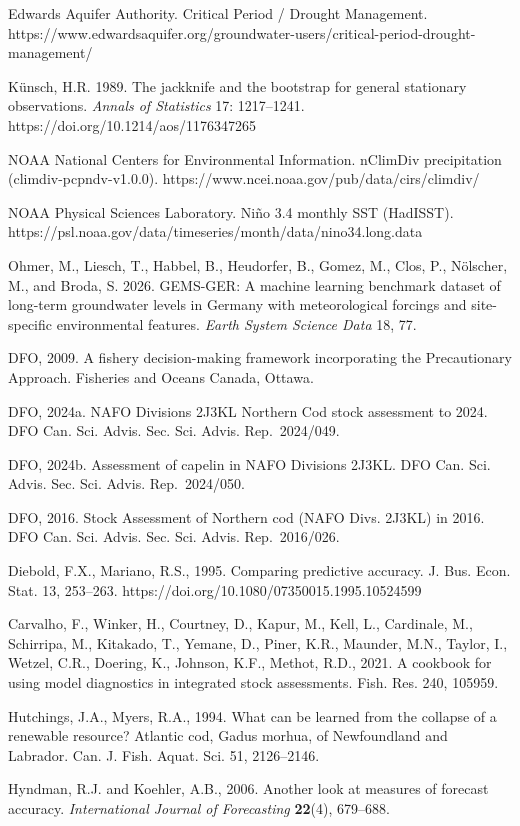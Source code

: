 \documentclass[11pt]{article}
\begin{document}
Edwards Aquifer Authority. Critical Period / Drought Management.
https://www.edwardsaquifer.org/groundwater-users/critical-period-drought-management/

K\"unsch, H.R. 1989. The jackknife and the bootstrap for general
stationary observations. \emph{Annals of Statistics} 17: 1217--1241.
https://doi.org/10.1214/aos/1176347265


NOAA National Centers for Environmental Information. nClimDiv
precipitation (climdiv-pcpndv-v1.0.0).
https://www.ncei.noaa.gov/pub/data/cirs/climdiv/

NOAA Physical Sciences Laboratory. Ni\~no 3.4 monthly SST (HadISST).
https://psl.noaa.gov/data/timeseries/month/data/nino34.long.data

Ohmer, M., Liesch, T., Habbel, B., Heudorfer, B., Gomez, M., Clos, P.,
N\"olscher, M., and Broda, S. 2026. GEMS-GER: A machine learning benchmark
dataset of long-term groundwater levels in Germany with meteorological
forcings and site-specific environmental features. \emph{Earth System
Science Data} 18, 77.

DFO, 2009. A fishery decision-making framework incorporating the
Precautionary Approach. Fisheries and Oceans Canada, Ottawa.

DFO, 2024a. NAFO Divisions 2J3KL Northern Cod stock assessment to 2024.
DFO Can. Sci. Advis. Sec. Sci. Advis. Rep.~2024/049.

DFO, 2024b. Assessment of capelin in NAFO Divisions 2J3KL. DFO Can. Sci.
Advis. Sec. Sci. Advis. Rep.~2024/050.

DFO, 2016. Stock Assessment of Northern cod (NAFO Divs. 2J3KL) in 2016.
DFO Can. Sci. Advis. Sec. Sci. Advis. Rep.~2016/026.

Diebold, F.X., Mariano, R.S., 1995. Comparing predictive accuracy. J.
Bus. Econ. Stat. 13, 253--263.
https://doi.org/10.1080/07350015.1995.10524599

Carvalho, F., Winker, H., Courtney, D., Kapur, M., Kell, L., Cardinale,
M., Schirripa, M., Kitakado, T., Yemane, D., Piner, K.R., Maunder, M.N.,
Taylor, I., Wetzel, C.R., Doering, K., Johnson, K.F., Methot, R.D.,
2021. A cookbook for using model diagnostics in integrated stock
assessments. Fish. Res. 240, 105959.

Hutchings, J.A., Myers, R.A., 1994. What can be learned from the
collapse of a renewable resource? Atlantic cod, Gadus morhua, of
Newfoundland and Labrador. Can. J. Fish. Aquat. Sci. 51, 2126--2146.

Hyndman, R.J. and Koehler, A.B., 2006. Another look at measures of forecast accuracy.
\emph{International Journal of Forecasting} \textbf{22}(4), 679--688.
\end{document}
